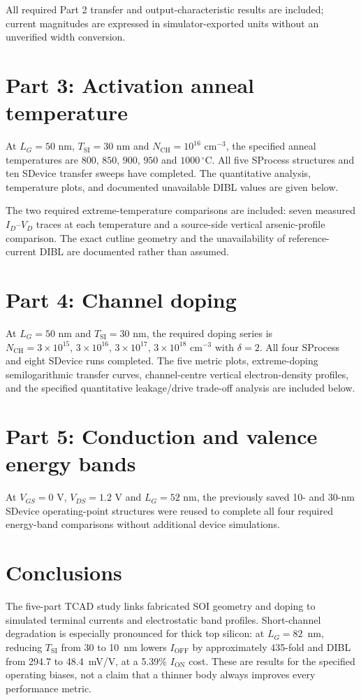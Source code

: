 \documentclass[11pt,a4paper]{article}
\begin{document}



All required Part 2 transfer and output-characteristic results
are included; current magnitudes are expressed in
simulator-exported units without an unverified width conversion.
\section{Part 3: Activation anneal temperature}
At $L_G=50$ nm, $T_{\mathrm{SI}}=30$ nm and $N_{\mathrm{CH}}=10^{16}$ cm$^{-3}$, the specified anneal temperatures are $800$, $850$, $900$, $950$ and $1000\,^\circ$C. All five SProcess structures and ten SDevice transfer sweeps have completed. The quantitative analysis, temperature plots, and documented unavailable DIBL values are given below.


The two required extreme-temperature comparisons are included: seven measured $I_D$--$V_D$ traces at each temperature and a source-side vertical arsenic-profile comparison. The exact cutline geometry and the unavailability of reference-current DIBL are documented rather than assumed.

\section{Part 4: Channel doping}
At $L_G=50$ nm and $T_{\mathrm{SI}}=30$ nm, the required doping series is
$N_{\mathrm{CH}}=3\times10^{15},\,3\times10^{16},\,3\times10^{17},
\,3\times10^{18}$ cm$^{-3}$ with $\delta=2$.
All four SProcess and eight SDevice runs completed.
The five metric plots, extreme-doping semilogarithmic transfer curves,
channel-centre vertical electron-density profiles, and the specified
quantitative leakage/drive trade-off analysis are included below.



\section{Part 5: Conduction and valence energy bands}
At $V_{GS}=0$ V, $V_{DS}=1.2$ V and $L_G=52$ nm,
the previously saved 10- and 30-nm SDevice operating-point
structures were reused to complete all four required energy-band
comparisons without additional device simulations.


\section{Conclusions}
The five-part TCAD study links fabricated SOI geometry and doping
to simulated terminal currents and electrostatic band profiles.
Short-channel degradation is especially pronounced for thick
top silicon: at $L_G=82$~nm, reducing $T_{\mathrm{SI}}$
from 30 to 10~nm lowers $I_{\mathrm{OFF}}$ by approximately
435-fold and DIBL from 294.7 to 48.4~mV/V, at a
5.39\% $I_{\mathrm{ON}}$ cost. These are results for
the specified operating biases, not a claim that a thinner
body always improves every performance metric.
\end{document}
